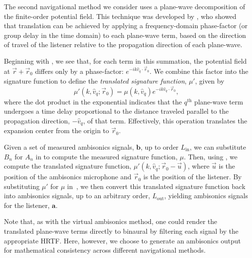 The second navigational method we consider uses a plane-wave decomposition of the finite-order potential field.
This technique was developed by \citet{SchultzSpors2013}, who showed that translation can be achieved by applying a frequency-domain phase-factor (or group delay in the time domain) to each plane-wave term, based on the direction of travel of the listener relative to the propagation direction of each plane-wave.

Beginning with , we see that, for each term in this summation, the potential field at $\vec{r} + \vec{r}_0$ differs only by a phase-factor: $e^{-i k \hat{v}_q \cdot \vec{r}_0}$.
We combine this factor into the signature function to define the \textit{translated signature function}, $\mu'$, given by \citep{MenziesAlAkaidi2007b}
\begin{equation}\label{eq:03_Navigation_Techniques:PW_Translation}
\mu'(k,\hat{v}_q;\vec{r}_0) = \mu(k,\hat{v}_q) e^{-i k \hat{v}_q \cdot \vec{r}_0},
\end{equation}
where the dot product in the exponential indicates that the $q^\text{th}$ plane-wave term undergoes a time delay proportional to the distance traveled parallel to the propagation direction, $-\hat{v}_q$, of that term.
Effectively, this operation translates the expansion center from the origin to $\vec{r}_0$.

Given a set of measured ambisonics signals, $\mathbf{b}$, up to order $L_\text{in}$, we can substitute $B_n$ for $A_n$ in  to compute the measured signature function, $\mu$.
Then, using ,
we compute the translated signature function, $\mu'(k,\hat{v}_q;\vec{r}_0 - \vec{u})$,
where $\vec{u}$ is the position of the ambisonics microphone and $\vec{r}_0$ is the position of the listener.
By substituting $\mu'$ for $\mu$ in~, we then convert this translated signature function back into ambisonics signals, up to an arbitrary order, $L_\text{out}$, yielding ambisonics signals for the listener, $\mathbf{a}$.

Note that, as with the virtual ambisonics method, one could render the translated plane-wave terms directly to binaural by filtering each signal by the appropriate HRTF.
Here, however, we choose to generate an ambisonics output for mathematical consistency across different navigational methods.